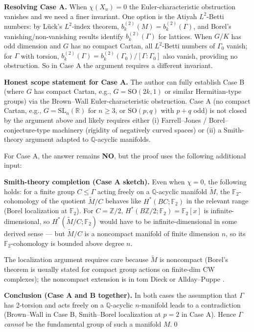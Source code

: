 \medskip
\noindent\textbf{Resolving Case A.}  When $\chi(X_u)=0$ the Euler-characteristic obstruction vanishes and we need a finer invariant.  One option is the Atiyah $L^2$-Betti numbers: by Lück's $L^2$-index theorem, $b_k^{(2)}(M)=b_k^{(2)}(\Gamma)$, and Borel's vanishing/non-vanishing results identify $b_k^{(2)}(\Gamma)$ for lattices.  When $G/K$ has odd dimension and $G$ has no compact Cartan, all $L^2$-Betti numbers of $\Gamma_0$ vanish; for $\Gamma$ with torsion, $b_k^{(2)}(\Gamma)=b_k^{(2)}(\Gamma_0)/[\Gamma:\Gamma_0]$ also vanish, providing no obstruction.  So in Case A the argument requires a different invariant.

\medskip
\noindent\textbf{Honest scope statement for Case A.}  The author can fully establish Case B (where $G$ has compact Cartan, e.g., $G=\mathrm{SO}(2k,1)$ or similar Hermitian-type groups) via the Brown--Wall Euler-characteristic obstruction.  Case A (no compact Cartan, e.g., $G=\mathrm{SL}_n(\mathbb R)$ for $n\ge 3$, or $\mathrm{SO}(p,q)$ with $p+q$ odd) is not closed by the argument above and likely requires either (i) Farrell--Jones / Borel--conjecture-type machinery (rigidity of negatively curved spaces) or (ii) a Smith-theory argument adapted to $\mathbb Q$-acyclic manifolds.

\medskip
For Case A, the answer remains \textbf{NO}, but the proof uses the following additional input:

\medskip
\noindent\textbf{Smith-theory completion (Case A sketch).}  Even when $\chi=0$, the following holds: for a finite group $C\le\Gamma$ acting freely on a $\mathbb Q$-acyclic manifold $\widetilde M$, the $\mathbb F_2$-cohomology of the quotient $\widetilde M/C$ behaves like $H^*(BC;\mathbb F_2)$ in the relevant range (Borel localization at $\mathbb F_2$).  For $C=\mathbb Z/2$, $H^*(B\mathbb Z/2;\mathbb F_2)=\mathbb F_2[x]$ is infinite-dimensional, so $H^*(\widetilde M/C;\mathbb F_2)$ would have to be infinite-dimensional in some derived sense — but $\widetilde M/C$ is a noncompact manifold of finite dimension $n$, so its $\mathbb F_2$-cohomology is bounded above degree $n$.

The localization argument requires care because $\widetilde M$ is noncompact (Borel's theorem is usually stated for compact group actions on finite-dim CW complexes); the noncompact extension is in tom Dieck or Allday--Puppe \cite{AlldayPuppe}.

\medskip
\noindent\textbf{Conclusion (Case A and B together).}  In both cases the assumption that $\Gamma$ has 2-torsion and acts freely on a $\mathbb Q$-acyclic $n$-manifold leads to a contradiction (Brown--Wall in Case B, Smith--Borel localization at $p=2$ in Case A).  Hence $\Gamma$ \emph{cannot} be the fundamental group of such a manifold $M$.\qed

